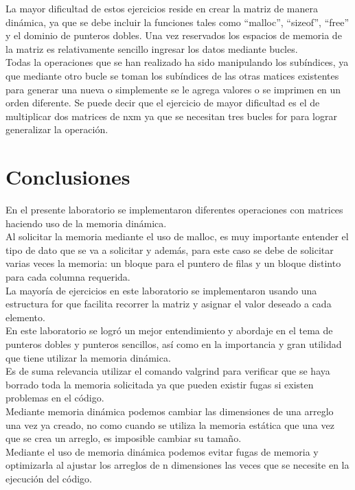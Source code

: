\documentclass[
  letterpaper, 
  maincolor=black,
  sectioncolor=black!90,
  subsectioncolor=black!70,
  itemtextcolor=black!40,
]{fortysecondscv}
\begin{document}
La mayor dificultad de estos ejercicios reside en crear la matriz de manera dinámica, ya que se debe incluir la funciones tales como “malloc”, “sizeof”, “free” y el dominio de punteros dobles. Una vez reservados los espacios de memoria de la matriz es relativamente sencillo ingresar los datos mediante bucles.\\

Todas la operaciones que se han realizado ha sido manipulando los subíndices, ya que mediante otro bucle se toman los subíndices de las otras matices existentes para generar una nueva o simplemente se le agrega valores o se imprimen en un orden diferente. Se puede decir que el ejercicio de mayor dificultad es el de multiplicar dos matrices de nxm ya que se necesitan tres bucles for para lograr generalizar la operación. \\



\section{Conclusiones}

En el presente laboratorio se implementaron diferentes operaciones con matrices haciendo uso de la memoria dinámica.\\ 

Al solicitar la memoria mediante el uso de malloc, es muy importante entender el tipo de dato que se va a solicitar y además, para este caso se debe de solicitar varias veces la memoria: un bloque para el puntero de filas y un bloque distinto para cada columna requerida.  \\

La mayoría de ejercicios en este laboratorio se implementaron usando una estructura for que facilita recorrer la matriz y asignar el valor deseado a cada elemento. \\

En este laboratorio se logró un mejor entendimiento y abordaje en el tema de punteros dobles y punteros sencillos, así como en la importancia y gran utilidad que tiene utilizar la memoria dinámica. \\

Es de suma relevancia utilizar el comando valgrind para verificar que se haya borrado toda la memoria solicitada ya que pueden existir fugas si existen problemas en el código.\\

Mediante memoria dinámica podemos cambiar las dimensiones de una arreglo una vez ya creado, no como cuando se utiliza la memoria estática que una vez que se crea un arreglo, es imposible cambiar su tamaño.\\

Mediante el uso de memoria dinámica podemos evitar fugas de memoria y optimizarla al ajustar los arreglos de n dimensiones las veces que se necesite en la ejecución del código.
\end{document}
